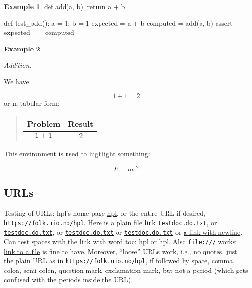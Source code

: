 \documentclass[%
oneside,                 %
final,                   %
10pt]{article}
\theoremstyle{definition}
\newtheorem{example}{Example}[section]
\begin{document}
\begin{enumerate}
\begin{example}
\bpycod
def add(a, b):
    return a + b

def test_add():
    a = 1; b = 1
    expected = a + b
    computed = add(a, b)
    assert expected == computed

\epycod

\end{example}

\begin{example}
\label{ex:math:1p1}

\noindent\emph{Addition}.

We have

\[ 1 + 1 = 2 \]
or in tabular form:


\begin{quote}
\begin{tabular}{cc}
\hline
\multicolumn{1}{c}{ Problem } & \multicolumn{1}{c}{ Result } \\
\hline
$1+1$   & $2$    \\
\hline
\end{tabular}
\end{quote}

\noindent
\end{example}

\begin{tcolorbox}[%
boxrule=1mm,
coltitle=black,
colframe=blue!45!white,
colback=blue!15!white,
width=(.9\linewidth),before=\hfill,after=\hfill,
adjusted title={Highlight box!}]
This environment is used to highlight something:

\[ E = mc^2 \]
\end{tcolorbox}

\subsection{URLs}
\label{subsubsec:ex}

Testing of URLs: hpl's home page \href{{https://folk.uio.no/hpl}}{hpl}, or
the entire URL if desired, \href{{https://folk.uio.no/hpl}}{\nolinkurl{https://folk.uio.no/hpl}}.  Here is a
plain file link \href{{testdoc.do.txt}}{\nolinkurl{testdoc.do.txt}}, or \href{{testdoc.do.txt}}{\nolinkurl{testdoc.do.txt}}, or
\href{{testdoc.do.txt}}{\nolinkurl{testdoc.do.txt}} or \href{{testdoc.do.txt}}{\nolinkurl{testdoc.do.txt}} or \href{{testdoc.do.txt}}{a link with
newline}. Can test spaces with the link with word
too: \href{{https://folk.uio.no/hpl}}{hpl} or \href{{https://folk.uio.no/hpl}}{hpl}. Also \texttt{file:///} works: \href{{file:///home/hpl/vc/doconce/doc/demos/manual/manual.html}}{link to a
file} is
fine to have. Moreover, ``loose'' URLs work, i.e., no quotes, just
the plain URL as in \href{{https://folk.uio.no/hpl}}{\nolinkurl{https://folk.uio.no/hpl}}, if followed by space, comma,
colon, semi-colon, question mark, exclamation mark, but not a period
(which gets confused with the periods inside the URL).


\end{enumerate}
\end{document}
